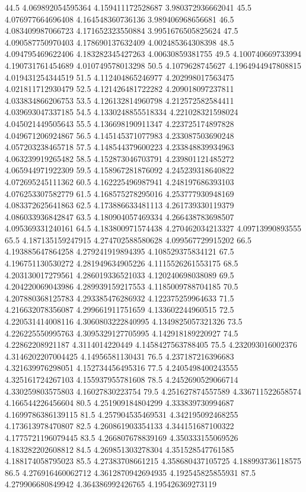 44.5 4.069892054595364 4.159411172528687 3.980372936662041
45.5 4.076977664696408 4.164548360736136 3.989406968656681
46.5 4.083409987066723 4.171652323550884 3.9951676505825624
47.5 4.090587750970403 4.178690137632409 4.002485364308398
48.5 4.094795469622406 4.183282345427263 4.00630859381755
49.5 4.100740669733994 4.190731761454689 4.010749578013298
50.5 4.1079628745627 4.1964944947808815 4.019431254344519
51.5 4.112404865246977 4.202998017563475 4.021811712930479
52.5 4.121426481722282 4.209018097237811 4.033834866206753
53.5 4.126132814960798 4.212572582584411 4.039693047337185
54.5 4.1330248855518334 4.221028321598024 4.045021449505643
55.5 4.136698190911347 4.223725174897828 4.049671206924867
56.5 4.145145371077983 4.233087503690248 4.057203238465718
57.5 4.148544379600223 4.233848839934963 4.063239919265482
58.5 4.152873046703791 4.239801121485272 4.065944971922309
59.5 4.158967281876092 4.245239318640822 4.072695245111362
60.5 4.162225496987941 4.248197686393103 4.076253307582779
61.5 4.168575278295016 4.253777930948169 4.083372625641863
62.5 4.173886633481113 4.261739330119379 4.086033936842847
63.5 4.180904057469334 4.266438783698507 4.095369331240161
64.5 4.183800971574438 4.270462034213327 4.09713990893555
65.5 4.187135159247915 4.274702588580628 4.099567729915202
66.5 4.193885647864258 4.279241919894395 4.108529375834121
67.5 4.196751130530272 4.281949634905226 4.1115526261553175
68.5 4.203130017279561 4.286019336521033 4.120240698038089
69.5 4.204220069043986 4.289939159217553 4.1185009788704185
70.5 4.207880368125783 4.293385476286932 4.122375259964633
71.5 4.216632078356087 4.299661911751659 4.133602244960515
72.5 4.220531414008116 4.3060803222840995 4.1349825057321326
73.5 4.226225550995763 4.3095329127705995 4.142918189220927
74.5 4.22862208921187 4.3114014220449 4.1458427563788405
75.5 4.232093016002376 4.3146202207004425 4.14956581130431
76.5 4.237187216396683 4.321639976298051 4.152734456495316
77.5 4.2405498400243555 4.325161724267103 4.155937955781608
78.5 4.2452690529066714 4.330259803575803 4.16027830223754
79.5 4.251627874557589 4.336711522658574 4.166544226456604
80.5 4.251909184804299 4.333839730994687 4.1699786386139115
81.5 4.257904535469531 4.342195092468255 4.173613978470807
82.5 4.260861903354133 4.344151687100322 4.1775721196079445
83.5 4.266807678839169 4.350333155069526 4.183282202608812
84.5 4.269851303278304 4.351528547761585 4.188174058795023
85.5 4.27383708661215 4.358680437105725 4.188993736118575
86.5 4.276916460062712 4.3612870942694935 4.192545825855931
87.5 4.279906680849942 4.364386992426765 4.195426369273119
